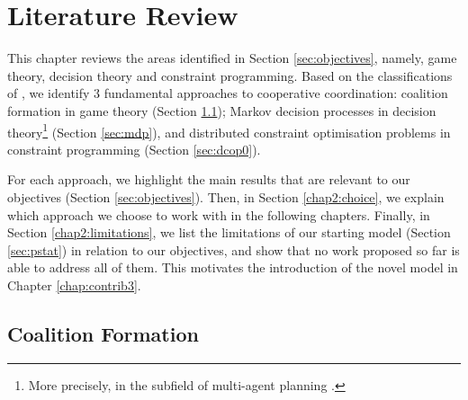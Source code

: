 \chapter{Literature Review}\label{chap:lit}

This chapter reviews the areas identified in Section \ref{sec:objectives}, namely, game
theory, decision theory and constraint programming. Based on the classifications of
\cite{ye2016,cerquides2013,cao2013,farinelli2004,ponda2015,
korsah2013taxonomy,gini2017,nunes2017taxonomy,khamis2015,parker2016,jahn2020,miloradovic2019tamer,skaltsis2021survey,verma2021,aziz2021},
we identify $3$ fundamental approaches to cooperative coordination: coalition formation in
game theory (Section \ref{sec:cf}); Markov decision processes in decision
theory\footnote{More precisely, in the subfield of multi-agent planning
\cite{torreno2017}.} (Section \ref{sec:mdp}), and distributed constraint optimisation
problems in constraint programming (Section \ref{sec:dcop0}).

For each approach, we highlight the main results that are relevant to our
objectives (Section \ref{sec:objectives}). Then, in Section \ref{chap2:choice}, we explain
which approach we choose to work with in the following chapters.
Finally, in Section \ref{chap2:limitations}, we list the limitations of our starting model
(Section \ref{sec:pstat}) in relation to our objectives, and show that no work proposed so
far is able to address all of them. This motivates the introduction of the novel model in
Chapter \ref{chap:contrib3}.

\section{Coalition Formation}\label{sec:cf}

